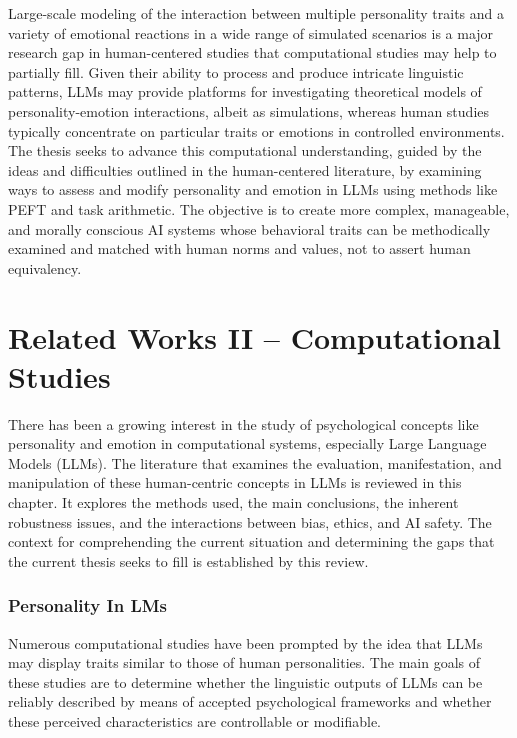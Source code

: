 \documentclass{DESSThesis}
\begin{document}
Large-scale modeling of the interaction between multiple personality traits and a variety of emotional reactions in a wide range of simulated scenarios is a major research gap in human-centered studies that computational studies may help to partially fill. Given their ability to process and produce intricate linguistic patterns, LLMs may provide platforms for investigating theoretical models of personality-emotion interactions, albeit as simulations, whereas human studies typically concentrate on particular traits or emotions in controlled environments. The thesis seeks to advance this computational understanding, guided by the ideas and difficulties outlined in the human-centered literature, by examining ways to assess and modify personality and emotion in LLMs using methods like PEFT and task arithmetic. The objective is to create more complex, manageable, and morally conscious AI systems whose behavioral traits can be methodically examined and matched with human norms and values, not to assert human equivalency.


\chapter{Related Works II – Computational Studies}
\thispagestyle{empty}

There has been a growing interest in the study of psychological concepts like personality and emotion in computational systems, especially Large Language Models (LLMs). The literature that examines the evaluation, manifestation, and manipulation of these human-centric concepts in LLMs is reviewed in this chapter. It explores the methods used, the main conclusions, the inherent robustness issues, and the interactions between bias, ethics, and AI safety. The context for comprehending the current situation and determining the gaps that the current thesis seeks to fill is established by this review.

\subsection{Personality In LMs}
Numerous computational studies have been prompted by the idea that LLMs may display traits similar to those of human personalities. The main goals of these studies are to determine whether the linguistic outputs of LLMs can be reliably described by means of accepted psychological frameworks and whether these perceived characteristics are controllable or modifiable.
\end{document}
